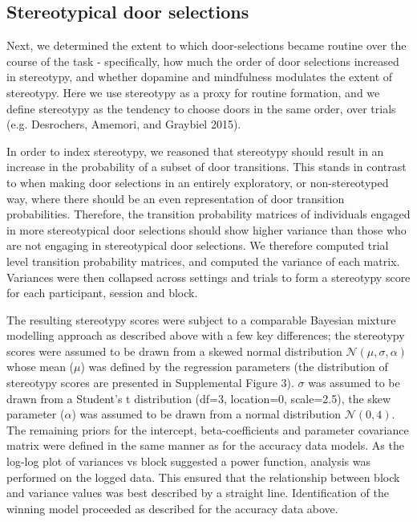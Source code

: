 \documentclass{article}
\begin{document}
\hypertarget{stereotypical-door-selections}{%
\subsection{Stereotypical door
selections}\label{stereotypical-door-selections}}

Next, we determined the extent to which door-selections became routine
over the course of the task - specifically, how much the order of door
selections increased in stereotypy, and whether dopamine and mindfulness
modulates the extent of stereotypy. Here we use stereotypy as a proxy
for routine formation, and we define stereotypy as the tendency to
choose doors in the same order, over trials (e.g. Desrochers, Amemori,
and Graybiel 2015).

In order to index stereotypy, we reasoned that stereotypy should result
in an increase in the probability of a subset of door transitions. This
stands in contrast to when making door selections in an entirely
exploratory, or non-stereotyped way, where there should be an even
representation of door transition probabilities. Therefore, the
transition probability matrices of individuals engaged in more
stereotypical door selections should show higher variance than those who
are not engaging in stereotypical door selections. We therefore computed
trial level transition probability matrices, and computed the variance
of each matrix. Variances were then collapsed across settings and trials
to form a stereotypy score for each participant, session and block.

The resulting stereotypy scores were subject to a comparable Bayesian
mixture modelling approach as described above with a few key
differences; the stereotypy scores were assumed to be drawn from a
skewed normal distribution \(\mathcal{N}(\mu, \sigma, \alpha)\) whose
mean (\(\mu\)) was defined by the regression parameters (the
distribution of stereotypy scores are presented in Supplemental Figure
3). \(\sigma\) was assumed to be drawn from a Student's t distribution
(df=3, location=0, scale=2.5), the skew parameter (\(\alpha\)) was
assumed to be drawn from a normal distribution \(\mathcal{N}(0,4)\). The
remaining priors for the intercept, beta-coefficients and parameter
covariance matrix were defined in the same manner as for the accuracy
data models. As the log-log plot of variances vs block suggested a power
function, analysis was performed on the logged data. This ensured that
the relationship between block and variance values was best described by
a straight line. Identification of the winning model proceeded as
described for the accuracy data above.
\end{document}

